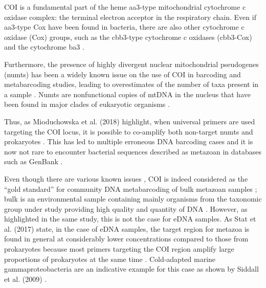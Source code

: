    COI is a fundamental part of the heme aa3-type mitochondrial cytochrome c oxidase complex: the terminal electron acceptor in the respiratory chain. 
   Even if aa3-type Cox have been found in bacteria, there are also other cytochrome c oxidase (Cox) groups, such as the cbb3-type cytochrome c oxidases (cbb3-Cox) and the cytochrome ba3 \citep{ekici2012biogenesis, schimo2017cytochrome}.

   Furthermore, the presence of highly divergent nuclear mitochondrial pseudogenes (numts) has been a widely known issue on the use of COI in barcoding and metabarcoding studies, leading to overestimates of the number of taxa present in a sample \citep{song2008many}.
   Numts are nonfunctional copies of mtDNA in the nucleus that have been found in major clades of eukaryotic organisms \citep{bensasson2001mitochondrial}.

   Thus, as Mioduchowska et al. (2018) \citep{mioduchowska2018instances} highlight, when universal primers are used targeting the COI locus, it is possible to co-amplify both non-target numts and prokaryotes \citep{siddall2009barcoding}. This has led to multiple erroneous DNA barcoding cases and it is now not rare to encounter bacterial sequences described as metazoan in databases such as GenBank \citep{mioduchowska2018instances}.



   Even though there are various known issues \citep{deagle2014dna}, COI is indeed considered as the “gold standard” for community DNA metabarcoding of bulk metazoan samples \citep{andujar2018coi}; 
   bulk is an environmental sample containing mainly organisms from the taxonomic group under study providing high quality and quantity of DNA \citep{taberletanalysis}. 
   However, as highlighted in the same study, this is not the case for eDNA samples. 
   As Stat et al. (2017) \citep{stat2017ecosystem} state, in the case of eDNA samples, the target region for metazoa is found in general at considerably lower concentrations compared to those from prokaryotes because most primers targeting the COI region amplify large proportions of prokaryotes at the same time \citep{yang2013testing, yang2014using, collins2019non}. 
   Cold-adapted marine gammaproteobacteria are an indicative example for this case as shown by Siddall et al. (2009) \citep{siddall2009barcoding}.



